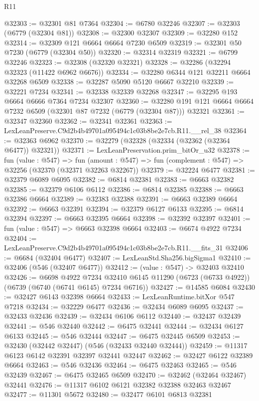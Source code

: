 \begin{lexlean}{R11}
\begin{coremodule}
@32303 := @32301 @81 @7364
@32304 := @6780 @32246
@32307 := @32303 (@6779 (@32304 @81))
@32308 := @32300 @32307
@32309 := @32280 @152
@32314 := @32309 @121 @6664 @6664 @7230 @6509
@32319 := @32301 @50 @7230 (@6779 (@32304 @50))
@32320 := @32314 @32319
@32321 := @6799 @32246
@32323 := @32308 (@32320 @32321)
@32328 := @32286 (@32294 @32323 (@11422 @6962 @6676))
@32334 := @32280 @6344 @121 @32211 @6664 @32268 @6509
@32338 := @32287 @5090 @5120 @6667 @32210
@32339 := @32221 @7234
@32341 := @32338 @32339 @32268
@32347 := @32295 @193 @6664 @6666 @7364 @7234 @32307
@32360 := @32280 @191 @121 @6664 @6664 @7232 @6509 (@32301 @87 @7232 (@6779 (@32304 @87))) @32321
@32361 := @32347 @32360
@32362 := @32341 @32361
@32363 := LexLeanPreserve.C9d2b4b49701a095494c1c03b8be2e7cb.R11.__rel_38
@32364 := @32363 @6962
@32370 := @32279 (@32328 (@32334 (@32362 (@32364 @6477)) @32321))
@32371 := LexLeanPreservation.prim_bitOr_u32
@32378 := fun (value : @547) =>
  fun (amount : @547) => fun (complement : @547) => @32256 (@32370 (@32371 @32263 @32267))
@32379 := @32224 @6477
@32381 := @32379 @6089 @6095
@32382 := @6814 @32381
@32383 := @6663 @32382
@32385 := @32379 @6106 @6112
@32386 := @6814 @32385
@32388 := @6663 @32386 @6664
@32389 := @32383 @32388
@32391 := @6663 @32389 @6664
@32392 := @6663 @32391
@32394 := @32379 @6127 @6133
@32395 := @6814 @32394
@32397 := @6663 @32395 @6664
@32398 := @32392 @32397
@32401 := fun (value : @547) => @6663 @32398 @6664
@32403 := @6674 @4922 @7234
@32404 := LexLeanPreserve.C9d2b4b49701a095494c1c03b8be2e7cb.R11.__fits_31
@32406 := @6684 (@32404 @6477)
@32407 := LexLeanStd.Sha256.bigSigma1
@32410 := @32406 (@546 (@32407 @6477))
@32412 := (value : @547) -> @32403 @32410
@32426 := @6698
    @4922
    @7234
    @32410
    @6145
    @11290
    (@6723 (@6733 @4922))
    (@6739 (@6740 (@6741 @6145) @7234 @6716))
@32427 := @14585 @6084
@32430 := @32427 @6143 @32398 @6664
@32433 := LexLeanRuntime.bitXor @547 @7218
@32434 := @32229 @6477
@32436 := @32434 @6089 @6095
@32437 := @32433 @32436
@32439 := @32434 @6106 @6112
@32440 := @32437 @32439
@32441 := @546 @32440
@32442 := @6475 @32441
@32444 := @32434 @6127 @6133
@32445 := @546 @32444
@32447 := @6475 @32445 @6509
@32453 := @32430 (@32442 @32447) (@546 (@32433 @32440 @32444))
@32459 := @11317 @6123 @6142 @32391 @32397 @32441 @32447
@32462 := @32427 @6122 @32389 @6664
@32463 := @546 @32436
@32464 := @6475 @32463
@32465 := @546 @32439
@32467 := @6475 @32465 @6509
@32470 := @32462 (@32464 @32467) @32441
@32476 := @11317 @6102 @6121 @32382 @32388 @32463 @32467
@32477 := @11301 @5672
@32480 := @32477 @6101 @6813 @32381

\end{coremodule}
\end{lexlean}
